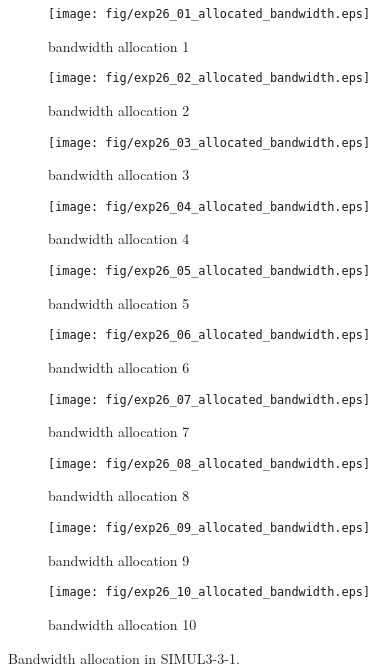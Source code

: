 	\begin{figure}
		\begin{center}
			\begin{subfigure}[b]{0.32\textwidth}
				\texttt{[image: fig/exp26\_01\_allocated\_bandwidth.eps]}
				\caption{bandwidth allocation 1}
				\label{figure:simul3_3_1_b_a}
			\end{subfigure}
			\begin{subfigure}[b]{0.32\textwidth}
				\texttt{[image: fig/exp26\_02\_allocated\_bandwidth.eps]}
				\caption{bandwidth allocation 2}
				\label{figure:simul3_3_1_b_b}
			\end{subfigure}
			\begin{subfigure}[b]{0.32\textwidth}
				\texttt{[image: fig/exp26\_03\_allocated\_bandwidth.eps]}
				\caption{bandwidth allocation 3}
				\label{figure:simul3_3_1_b_c}
			\end{subfigure}
			\begin{subfigure}[b]{0.32\textwidth}
				\texttt{[image: fig/exp26\_04\_allocated\_bandwidth.eps]}
				\caption{bandwidth allocation 4}
				\label{figure:simul3_3_1_b_d}
			\end{subfigure}
			\begin{subfigure}[b]{0.32\textwidth}
				\texttt{[image: fig/exp26\_05\_allocated\_bandwidth.eps]}
				\caption{bandwidth allocation 5}
				\label{figure:simul3_3_1_b_e}
			\end{subfigure}
			\begin{subfigure}[b]{0.32\textwidth}
				\texttt{[image: fig/exp26\_06\_allocated\_bandwidth.eps]}
				\caption{bandwidth allocation 6}
				\label{figure:simul3_3_1_b_f}
			\end{subfigure}
			\begin{subfigure}[b]{0.32\textwidth}
				\texttt{[image: fig/exp26\_07\_allocated\_bandwidth.eps]}
				\caption{bandwidth allocation 7}
				\label{figure:simul3_3_1_b_g}
			\end{subfigure}
			\begin{subfigure}[b]{0.32\textwidth}
				\texttt{[image: fig/exp26\_08\_allocated\_bandwidth.eps]}
				\caption{bandwidth allocation 8}
				\label{figure:simul3_3_1_b_h}
			\end{subfigure}
			\begin{subfigure}[b]{0.32\textwidth}
				\texttt{[image: fig/exp26\_09\_allocated\_bandwidth.eps]}
				\caption{bandwidth allocation 9}
				\label{figure:simul3_3_1_b_i}
			\end{subfigure}
			\begin{subfigure}[b]{0.32\textwidth}
				\texttt{[image: fig/exp26\_10\_allocated\_bandwidth.eps]}
				\caption{bandwidth allocation 10}
				\label{figure:simul3_3_1_b_j}
			\end{subfigure}
			\caption{Bandwidth allocation in SIMUL3-3-1.}
			\label{figure:simul3_3_1_ba}
		\end{center}
	\end{figure}


